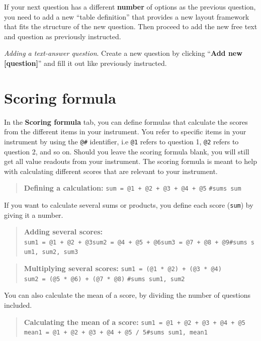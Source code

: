 \documentclass[
]{book}
\begin{document}
If your next question has a different \textbf{number} of options as the previous question, you need to add a new ``table definition'' that provides a new layout framework that fits the structure of the new question. Then proceed to add the new free text and question as previously instructed.

\emph{Adding a text-answer question}.
Create a new question by clicking ``\textbf{Add new {[}question{]}}'' and fill it out like previously instructed.

\section{Scoring formula}\label{scoring-formula}

In the \textbf{Scoring formula} tab, you can define formulas that calculate the scores from the different items in your instrument. You refer to specific items in your instrument by using the \texttt{@\#} identifier, i.e \texttt{@1} refers to question 1, \texttt{@2} refers to question 2, and so on.
Should you leave the scoring formula blank, you will still get all value readouts from your instrument. The scoring formula is meant to help with calculating different scores that are relevant to your instrument.

\begin{quote}
\textbf{Defining a calculation:} \texttt{sum\ =\ @1\ +\ @2\ +\ @3\ +\ @4\ +\ @5}
\texttt{\#sums\ sum}
\end{quote}

If you want to calculate several sums or products, you define each score (\texttt{sum}) by giving it a number.

\begin{quote}
\textbf{Adding several scores:} \texttt{sum1\ =\ @1\ +\ @2\ +\ @3}\texttt{sum2\ =\ @4\ +\ @5\ +\ @6}\texttt{sum3\ =\ @7\ +\ @8\ +\ @9}\texttt{\#sums\ sum1,\ sum2,\ sum3}
\end{quote}

\begin{quote}
\textbf{Multiplying several scores:} \texttt{sum1\ =\ (@1\ *\ @2)\ +\ (@3\ *\ @4)} \texttt{sum2\ =\ (@5\ *\ @6)\ +\ (@7\ *\ @8)} \texttt{\#sums\ sum1,\ sum2}
\end{quote}

You can also calculate the mean of a score, by dividing the number of questions included.

\begin{quote}
\textbf{Calculating the mean of a score:} \texttt{sum1\ =\ @1\ +\ @2\ +\ @3\ +\ @4\ +\ @5} \texttt{mean1\ =\ @1\ +\ @2\ +\ @3\ +\ @4\ +\ @5\ /\ 5}\texttt{\#sums\ sum1,\ mean1}
\end{quote}
\end{document}
